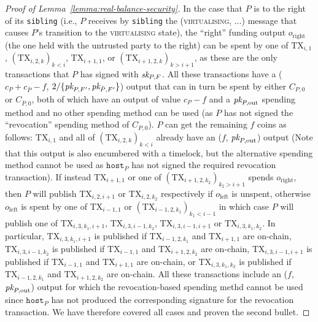 \begin{proof}[Proof of Lemma~\ref{lemma:real-balance-security}]
  In the case that $P$ is to the right of its \texttt{sibling} (i.e., $P$
  receives by \texttt{sibling} the (\textsc{virtualising}, $\dots$) message that
  causes $P$'s transition to the \textsc{virtualising} state), the ``right''
  funding output $o_{\mathrm{right}}$ (the one held with the untrusted party to
  the right) can be spent by one of $\mathrm{TX}_{i, 1}$, $(\mathrm{TX}_{i, 2,
  k})_{k < i}$, $\mathrm{TX}_{i+1, 1}$, or $(\mathrm{TX}_{i+1, 2, k})_{k >
  i+1}$, as these are the only transactions that $P$ has signed with $\textit{sk}_{P,
  F}$. All these transactions have a ($c_P + c_{\bar{P}} - f$, $2/\{\textit{pk}_{P, F'},
  \textit{pk}_{\bar{P}, F'}\}$) output that can in turn be spent by either $C_{P, 0}$ or
  $C_{\bar{P}, 0}$, both of which have an output of value $c_P-f$ and a $\textit{pk}_{P,
  \mathrm{out}}$ spending method and no other spending method can be used (as
  $P$ has not signed the ``revocation'' spending method of $C_{P, 0}$). $P$ can
  get the remaining $f$ coins as follows: $\mathrm{TX}_{i, 1}$ and all of
  $(\mathrm{TX}_{i, 2, k})_{k < i}$ already have an ($f$, $\textit{pk}_{P,
  \mathrm{out}}$) output (Note that this output is also
  encumbered with a timelock, but the alternative spending method cannot be used
  as $\texttt{host}_P$ has not signed the required revocation transaction). If
  instead $\mathrm{TX}_{i+1, 1}$ or one of
  $(\mathrm{TX}_{i+1, 2, k_2})_{k_2 > i+1}$ spends $o_{\mathrm{right}}$, then
  $P$ will publish $\mathrm{TX}_{i, 2, i+1}$ or $\mathrm{TX}_{i, 2, k_2}$
  respectively if $o_{\mathrm{left}}$ is unspent, otherwise $o_{\mathrm{left}}$
  is spent by one of $\mathrm{TX}_{i-1, 1}$ or $(\mathrm{TX}_{i-1, 2, k_1})_{k_1
  < i-1}$ in which case $P$ will publish one of $\mathrm{TX}_{i, 3, k_1, i+1}$,
  $\mathrm{TX}_{i, 3, i-1, k_2}$, $\mathrm{TX}_{i, 3, i-1, i+1}$ or
  $\mathrm{TX}_{i, 3, k_1, k_2}$. In particular, $\mathrm{TX}_{i, 3, k_1, i+1}$
  is published if $\mathrm{TX}_{i-1, 2, k_1}$ and $\mathrm{TX}_{i+1, 1}$ are
  on-chain, $\mathrm{TX}_{i, 3, i-1, k_2}$ is published if $\mathrm{TX}_{i-1,
  1}$ and $\mathrm{TX}_{i+1, 2, k_2}$ are on-chain, $\mathrm{TX}_{i, 3, i-1,
  i+1}$ is published if $\mathrm{TX}_{i-1, 1}$ and $\mathrm{TX}_{i+1, 1}$ are
  on-chain, or $\mathrm{TX}_{i, 3, k_1, k_2}$ is published if $\mathrm{TX}_{i-1,
  2, k_1}$ and $\mathrm{TX}_{i+1, 2, k_2}$ are on-chain.  All these transactions
  include an ($f$, $\textit{pk}_{P, \mathrm{out}}$) output for which the revocation-based
  spending methd cannot be used since $\texttt{host}_P$ has not produced the
  corresponding signature for the revocation transaction. We have therefore
  covered all cases and proven the second bullet.


\end{proof}
